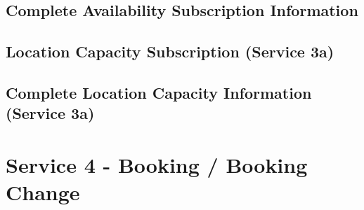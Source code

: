 \subsection*{Complete Availability Subscription Information}
\label{subsec:Nachrichten:Dienst3:CompleteAvailability}



\medskip




\subsection*{Location Capacity Subscription (Service 3a)}
\label{subsec:Nachrichten:Dienst3:PlaceAvailabilitySubscription}





% 

% 



\subsection*{Complete Location Capacity Information (Service 3a)}
\label{subsec:Nachrichten:Dienst3:CompletePlaceAvailability}





\section{Service 4 - Booking / Booking Change}
\label{sec:Nachrichten:Dienst4}

